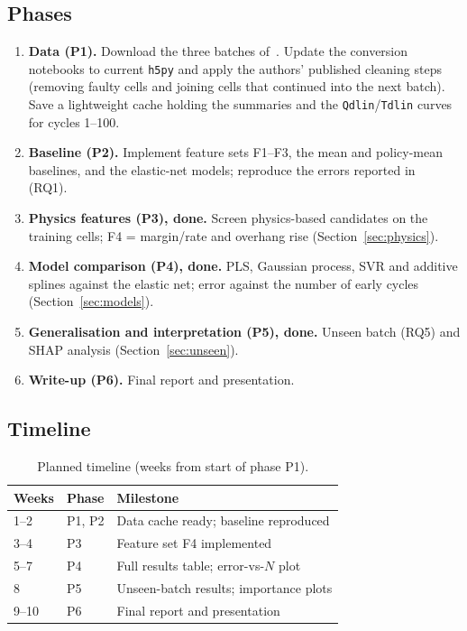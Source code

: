 \subsection{Phases}
\begin{enumerate}
  \item \textbf{Data (P1).} Download the three batches of~\cite{matr_data}.
  Update the conversion notebooks to current \texttt{h5py} and apply the
  authors' published cleaning steps (removing faulty cells and joining
  cells that continued into the next batch). Save a lightweight cache
  holding the summaries and the \texttt{Qdlin}/\texttt{Tdlin} curves for
  cycles 1--100.
  \item \textbf{Baseline (P2).} Implement feature sets F1--F3, the
  mean and policy-mean baselines, and the elastic-net models; reproduce the
  errors reported in~\cite{severson2019} (RQ1).
  \item \textbf{Physics features (P3), done.} Screen physics-based
  candidates on the training cells; F4 = margin/rate and overhang
  rise (Section~\ref{sec:physics}).
  \item \textbf{Model comparison (P4), done.} PLS, Gaussian process, SVR and
  additive splines against the elastic net; error against the number of
  early cycles (Section~\ref{sec:models}).
  \item \textbf{Generalisation and interpretation (P5), done.} Unseen batch
  (RQ5) and SHAP analysis (Section~\ref{sec:unseen}).
  \item \textbf{Write-up (P6).} Final report and presentation.
\end{enumerate}

\subsection{Timeline}
\begin{table}[h]
\centering
\caption{Planned timeline (weeks from start of phase P1).}
\label{tab:timeline}
\begin{tabular}{@{}lll@{}}
\toprule
Weeks & Phase & Milestone \\
\midrule
1--2  & P1, P2 & Data cache ready; baseline reproduced \\
3--4  & P3     & Feature set F4 implemented \\
5--7  & P4     & Full results table; error-vs-$N$ plot \\
8     & P5     & Unseen-batch results; importance plots \\
9--10 & P6     & Final report and presentation \\
\bottomrule
\end{tabular}
\end{table}


